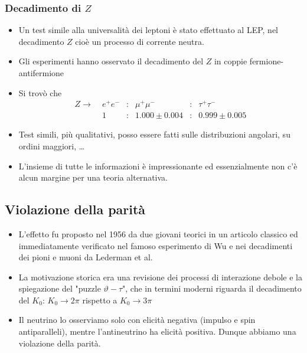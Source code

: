 \subsubsection{Decadimento di $Z$}
\begin{itemize}
    \item Un test simile alla universalità dei leptoni è stato effettuato al LEP, nel decadimento $Z$ cioè un processo di corrente neutra. 
    \item Gli esperimenti hanno osservato il decadimento del $Z$ in coppie fermione-antifermione
    \item Si trovò che
    \begin{align*}
    Z \to & \; e^+e^- & : & \mu^+\mu^- & : & \tau^+\tau^- \\
    & \; 1 & : & 1.000 \pm 0.004 & : & 0.999 \pm 0.005
    \end{align*}
    \item Test simili, più qualitativi, posso essere fatti sulle distribuzioni angolari, su ordini maggiori, \dots
    \item L'insieme di tutte le informazioni è impressionante ed essenzialmente non c'è alcun margine per una teoria alternativa.
\end{itemize}
\subsection{Violazione della parità}
\begin{itemize}
    \item L'effetto fu proposto nel 1956 da due giovani teorici in un articolo classico ed immediatamente verificato nel famoso esperimento di Wu e nei decadimenti dei pioni e muoni da Lederman et al.
    \item La motivazione storica era una revisione dei processi di interazione debole e la spiegazione del "puzzle $\vartheta-\tau$", che in termini moderni riguarda il decadimento del $K_0$: $K_0\to2\pi$ rispetto a $K_0\to3\pi$
    \item Il neutrino lo osserviamo solo con elicità negativa (impulso e spin antiparalleli), mentre l'antineutrino ha elicità positiva. Dunque abbiamo una violazione della parità.
\end{itemize}

